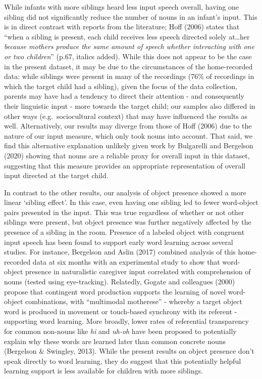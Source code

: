 \documentclass[
  man,floatsintext]{apa6}
\begin{document}
While infants with more siblings heard less input speech overall, having one sibling did not significantly reduce the number of nouns in an infant's input. This is in direct contrast with reports from the literature; Hoff (2006) states that ``when a sibling is present, each child receives less speech directed solely at\ldots her \emph{because mothers produce the same amount of speech whether interacting with one or two children}'' (p.67, italics added). While this does not appear to be the case in the present dataset, it may be due to the circumstances of the home-recorded data: while siblings were present in many of the recordings (76\% of recordings in which the target child had a sibling), given the focus of the data collection, parents may have had a tendency to direct their attention - and consequently their linguistic input - more towards the target child; our samples also differed in other ways (e.g.~sociocultural context) that may have influenced the results as well. Alternatively, our results may diverge from those of Hoff (2006) due to the nature of our input measure, which only took nouns into account. That said, we find this alternative explanation unlikely given work by Bulgarelli and Bergelson (2020) showing that nouns are a reliable proxy for overall input in this dataset, suggesting that this measure provides an appropriate representation of overall input directed at the target child.

In contrast to the other results, our analysis of object presence showed a more linear `sibling effect'. In this case, even having one sibling led to fewer word-object pairs presented in the input. This was true regardless of whether or not other siblings were present, but object presence was further negatively affected by the presence of a sibling in the room. Presence of a labeled object with congruent input speech has been found to support early word learning across several studies. For instance, Bergelson and Aslin (2017) combined analysis of this home-recorded data at six months with an experimental study to show that word-object presence in naturalistic caregiver input correlated with comprehension of nouns (tested using eye-tracking). Relatedly, Gogate and colleagues (2000) propose that contingent word production supports the learning of novel word-object combinations, with ``multimodal motherese'' - whereby a target object word is produced in movement or touch-based synchrony with its referent - supporting word learning. More broadly, lower rates of referential transparency for common non-nouns like \emph{hi} and \emph{uh-oh} have been proposed to potentially explain why these words are learned later than common concrete nouns (Bergelson \& Swingley, 2013). While the present results on object presence don't speak directly to word learning, they do suggest that this potentially helpful learning support is less available for children with more siblings.
\end{document}

